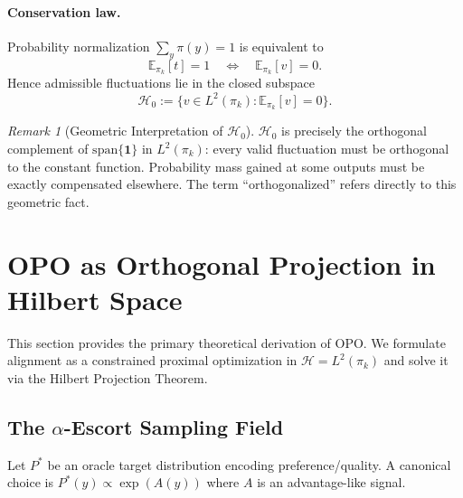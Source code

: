 \documentclass[11pt]{article}
\theoremstyle{definition}
\theoremstyle{remark}
\newtheorem{remark}[theorem]{Remark}
\newcommand{\E}{\mathbb{E}}
\newcommand{\pik}{\pi_k}
\begin{document}
\paragraph{Conservation law.}
Probability normalization $\sum_y \pi(y)=1$ is equivalent to
\begin{equation}
\label{eq:conservation}
\E_{\pik}[t]=1 \quad\Longleftrightarrow\quad \E_{\pik}[v]=0.
\end{equation}
Hence admissible fluctuations lie in the closed subspace
\begin{equation}
\label{eq:H0}
\mathcal{H}_0 := \{ v \in L^2(\pik) : \E_{\pik}[v]=0\}.
\end{equation}

\begin{remark}[Geometric Interpretation of $\mathcal{H}_0$]
$\mathcal{H}_0$ is precisely the orthogonal complement of $\mathrm{span}\{\mathbf{1}\}$ in $L^2(\pik)$: every valid fluctuation must be orthogonal to the constant function. Probability mass gained at some outputs must be exactly compensated elsewhere. The term ``orthogonalized'' refers directly to this geometric fact.
\end{remark}

\section{OPO as Orthogonal Projection in Hilbert Space}
\label{sec:hilbert_framework}

This section provides the primary theoretical derivation of OPO. We formulate alignment as a constrained proximal optimization in $\mathcal{H} = L^2(\pik)$ and solve it via the Hilbert Projection Theorem.

\subsection{The $\alpha$-Escort Sampling Field}

Let $P^*$ be an oracle target distribution encoding preference/quality.
A canonical choice is $P^*(y)\propto \exp(A(y))$ where $A$ is an advantage-like signal.
\end{document}
